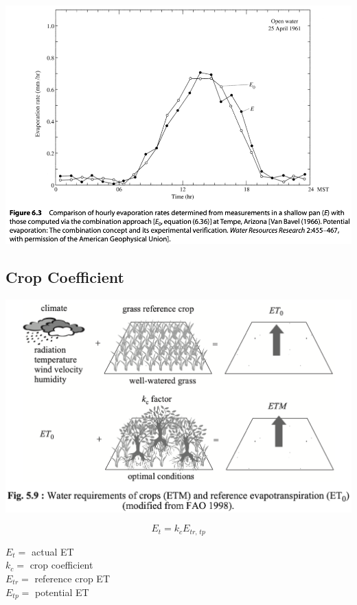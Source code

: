 \documentclass[
  letterpaper,
  DIV=11,
  numbers=noendperiod]{scrreprt}
\begin{document}
\includegraphics{archive/figures/dingman-figure6.3.png}

\hypertarget{crop-coefficient}{%
\subsection{Crop Coefficient}\label{crop-coefficient}}

\includegraphics{archive/figures/musy-figure5.9.png}

\[ E_{t} = k_c E_{tr,\, tp} \]

\(E_{t}=\) actual ET\\
\(k_c=\) crop coefficient\\
\(E_{tr}=\) reference crop ET\\
\(E_{tp}=\) potential ET
\end{document}
